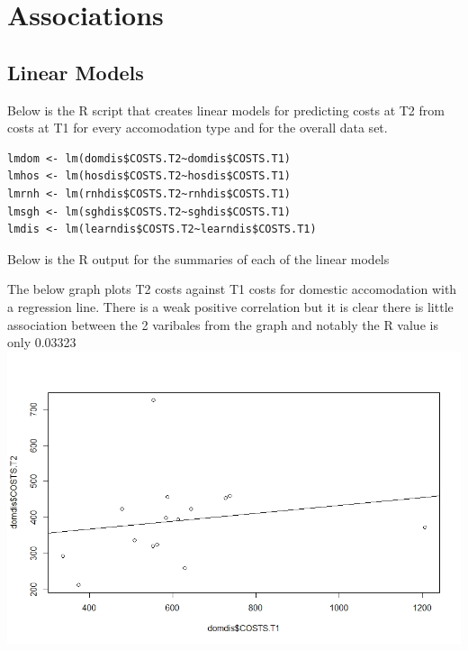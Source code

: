 \documentclass[]{article}
\begin{document}
\section{Associations}
\subsection{Linear Models}
Below is the R script that creates linear models for predicting costs at T2 from costs at T1 for every accomodation type and for the overall data set.
\begin{lstlisting}
lmdom <- lm(domdis$COSTS.T2~domdis$COSTS.T1)
lmhos <- lm(hosdis$COSTS.T2~hosdis$COSTS.T1)
lmrnh <- lm(rnhdis$COSTS.T2~rnhdis$COSTS.T1)
lmsgh <- lm(sghdis$COSTS.T2~sghdis$COSTS.T1)
lmdis <- lm(learndis$COSTS.T2~learndis$COSTS.T1)
\end{lstlisting}
Below is the R output for the summaries of each of the linear models



The below graph plots T2 costs against T1 costs for domestic accomodation with a regression line. There is a weak positive correlation but it is clear there is little association between the 2 varibales from the graph and notably the R value is only 0.03323
\centering
\includegraphics[width=\textwidth]{RStudio/jpeg/Reg_DOM.jpeg}
\raggedright
\end{document}
